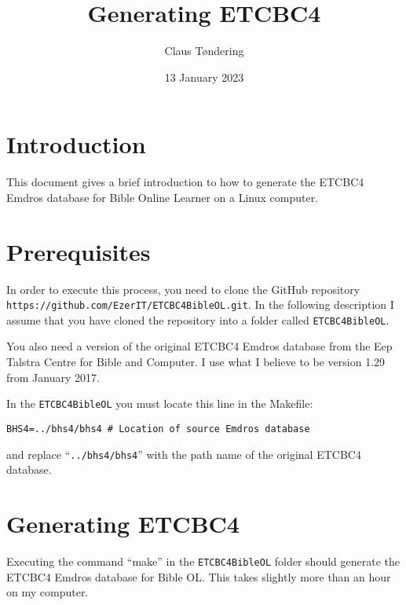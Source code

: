\documentclass[11pt,oneside,a4paper,article]{memoir}
\title{Generating ETCBC4}
\author{Claus Tøndering}
\date{13 January 2023}
\begin{document}
\maketitle


\chapter{Introduction}

This document gives a brief introduction to how to generate the ETCBC4 Emdros database for Bible
Online Learner on a Linux computer.

\chapter{Prerequisites}

In order to execute this process, you need to clone the GitHub repository
\texttt{https://github.com/\-EzerIT/ETCBC4BibleOL.git}. In the following description I assume that you
have cloned the repository into a folder called \texttt{ETCBC4BibleOL}.

You also need a version of the original ETCBC4 Emdros database from the Eep Talstra Centre for Bible
and Computer. I use what I believe to be version 1.29 from January 2017.

In the \texttt{ETCBC4BibleOL} you must locate this line in the Makefile:

\vspace{1ex}

\quad\texttt{BHS4=../bhs4/bhs4  \# Location of source Emdros database}

\vspace{1ex}

\noindent
and replace ``\texttt{../bhs4/bhs4}'' with the path name of the original ETCBC4 database.

\chapter{Generating ETCBC4}

Executing the command ``make'' in the \texttt{ETCBC4BibleOL} folder should generate the ETCBC4
Emdros database for Bible OL. This takes slightly more than an hour on my computer.
\end{document}

